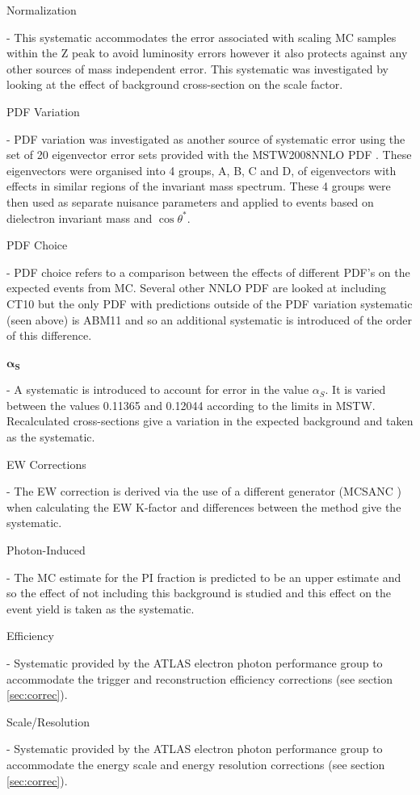     {\bf\raggedright Normalization} - This systematic accommodates the error associated with scaling MC samples within the Z peak to avoid luminosity errors however it also protects against any other sources of mass independent error. This systematic was investigated by looking at the effect of background cross-section on the scale factor. \\
    {\bf\raggedright PDF Variation} - PDF variation was investigated as another source of systematic error using the set of 20 eigenvector error sets provided with the MSTW2008NNLO PDF \cite{Martin:2009iq}. These eigenvectors were organised into 4 groups, A, B, C and D, of eigenvectors with effects in similar regions of the invariant mass spectrum. These 4 groups were then used as separate nuisance parameters and applied to events based on dielectron invariant mass and $\cos{\theta^{*}}$. \\ 
    {\bf\raggedright PDF Choice} - PDF choice refers to a comparison between the effects of different PDF's on the expected events from MC. Several other NNLO PDF are looked at including CT10 but the only PDF with predictions outside of the PDF variation systematic (seen above) is ABM11 \cite{Alekhin:2013dmy} and so an additional systematic is introduced of the order of this difference. \\
    {\bf\raggedright $\boldsymbol{\alpha_{S}}$} - A systematic is introduced to account for error in the value $\alpha_{S}$. It is varied between the values 0.11365 and 0.12044 according to the limits in MSTW. Recalculated cross-sections give a variation in the expected background and taken as the systematic. \\
    {\bf\raggedright EW Corrections} - The EW correction is derived via the use of a different generator (MCSANC \cite{Bondarenko:2013nu}) when calculating the EW K-factor and differences between the method give the systematic. \\
    {\bf\raggedright Photon-Induced} - The MC estimate for the PI fraction is predicted to be an upper estimate and so the effect of not including this background is studied and this effect on the event yield is taken as the systematic. \\
    {\bf\raggedright Efficiency} - Systematic provided by the ATLAS electron photon performance group to accommodate the trigger and reconstruction efficiency corrections (see section \ref{sec:correc}). \\
    {\bf\raggedright Scale/Resolution} - Systematic provided by the ATLAS electron photon performance group to accommodate the energy scale and energy resolution corrections (see section \ref{sec:correc}). \\
